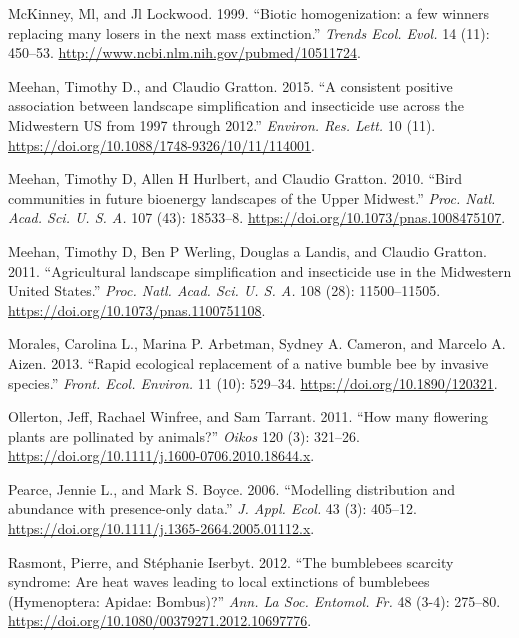 \documentclass[11pt,]{article}
\begin{document}
\leavevmode\hypertarget{ref-McKinney1999}{}%
McKinney, Ml, and Jl Lockwood. 1999. ``Biotic homogenization: a few
winners replacing many losers in the next mass extinction.''
\emph{Trends Ecol. Evol.} 14 (11): 450--53.
\url{http://www.ncbi.nlm.nih.gov/pubmed/10511724}.

\leavevmode\hypertarget{ref-Meehan2015}{}%
Meehan, Timothy D., and Claudio Gratton. 2015. ``A consistent positive
association between landscape simplification and insecticide use across
the Midwestern US from 1997 through 2012.'' \emph{Environ. Res. Lett.}
10 (11). \url{https://doi.org/10.1088/1748-9326/10/11/114001}.

\leavevmode\hypertarget{ref-Meehan2010a}{}%
Meehan, Timothy D, Allen H Hurlbert, and Claudio Gratton. 2010. ``Bird
communities in future bioenergy landscapes of the Upper Midwest.''
\emph{Proc. Natl. Acad. Sci. U. S. A.} 107 (43): 18533--8.
\url{https://doi.org/10.1073/pnas.1008475107}.

\leavevmode\hypertarget{ref-Meehan2011}{}%
Meehan, Timothy D, Ben P Werling, Douglas a Landis, and Claudio Gratton.
2011. ``Agricultural landscape simplification and insecticide use in the
Midwestern United States.'' \emph{Proc. Natl. Acad. Sci. U. S. A.} 108
(28): 11500--11505. \url{https://doi.org/10.1073/pnas.1100751108}.

\leavevmode\hypertarget{ref-Morales2013}{}%
Morales, Carolina L., Marina P. Arbetman, Sydney A. Cameron, and Marcelo
A. Aizen. 2013. ``Rapid ecological replacement of a native bumble bee by
invasive species.'' \emph{Front. Ecol. Environ.} 11 (10): 529--34.
\url{https://doi.org/10.1890/120321}.

\leavevmode\hypertarget{ref-Ollerton2011}{}%
Ollerton, Jeff, Rachael Winfree, and Sam Tarrant. 2011. ``How many
flowering plants are pollinated by animals?'' \emph{Oikos} 120 (3):
321--26. \url{https://doi.org/10.1111/j.1600-0706.2010.18644.x}.

\leavevmode\hypertarget{ref-Pearce2006}{}%
Pearce, Jennie L., and Mark S. Boyce. 2006. ``Modelling distribution and
abundance with presence-only data.'' \emph{J. Appl. Ecol.} 43 (3):
405--12. \url{https://doi.org/10.1111/j.1365-2664.2005.01112.x}.

\leavevmode\hypertarget{ref-Rasmont2012}{}%
Rasmont, Pierre, and Stéphanie Iserbyt. 2012. ``The bumblebees scarcity
syndrome: Are heat waves leading to local extinctions of bumblebees
(Hymenoptera: Apidae: Bombus)?'' \emph{Ann. La Soc. Entomol. Fr.} 48
(3-4): 275--80. \url{https://doi.org/10.1080/00379271.2012.10697776}.
\end{document}
